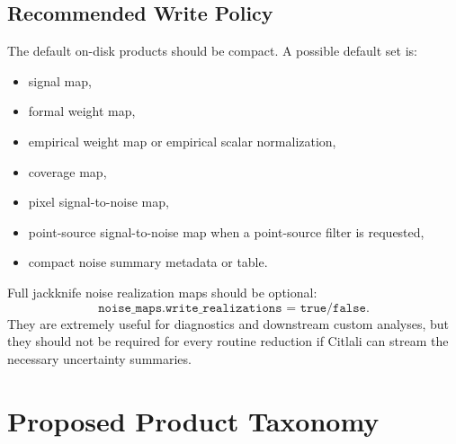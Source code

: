 \documentclass[11pt]{article}
\begin{document}
\subsection{Recommended Write Policy}

The default on-disk products should be compact. A possible default set is:

\begin{itemize}[leftmargin=1.5em]
\item signal map,
\item formal weight map,
\item empirical weight map or empirical scalar normalization,
\item coverage map,
\item pixel signal-to-noise map,
\item point-source signal-to-noise map when a point-source filter is requested,
\item compact noise summary metadata or table.
\end{itemize}

Full jackknife noise realization maps should be optional:
\[
  \texttt{noise\_maps.write\_realizations = true/false}.
\]
They are extremely useful for diagnostics and downstream custom analyses, but
they should not be required for every routine reduction if Citlali can stream
the necessary uncertainty summaries.

\section{Proposed Product Taxonomy}
\end{document}

